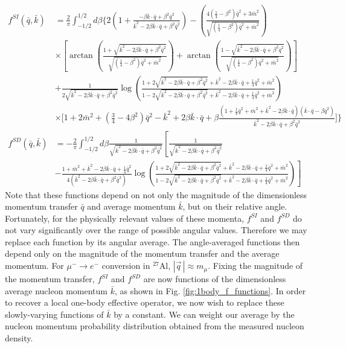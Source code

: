 \documentclass{book}[letterpaper,12pt]
\begin{document}
\begin{equation}
\begin{split}
f^{SI}(\bar{q},\bar{k})&=\frac{2}{\pi}\int_{-1/2}^{1/2}d\beta\Bigg\{2\left(1+\frac{-\beta\bar{k}\cdot\bar{q}+\beta^2\bar{q}^2}{\bar{k}^2-2\beta\bar{k}\cdot\bar{q}+\beta^2\bar{q}^2}\right)-\left(\frac{4(\frac{1}{4}-\beta^2)\bar{q}^2+3\bar{m}^2}{\sqrt{(\frac{1}{4}-\beta^2)\bar{q}^2+\bar{m}^2}}\right)\\
&\times\left[\arctan\left(\frac{1+\sqrt{\bar{k}^2-2\beta\bar{k}\cdot\bar{q}+\beta^2\bar{q}^2}}{\sqrt{(\frac{1}{4}-\beta^2)\bar{q}^2+\bar{m}^2}}\right)+\arctan\left(\frac{1-\sqrt{\bar{k}^2-2\beta\bar{k}\cdot\bar{q}+\beta^2\bar{q}^2}}{\sqrt{(\frac{1}{4}-\beta^2)\bar{q}^2+\bar{m}^2}}\right)\right]\\
&+\frac{1}{2\sqrt{\bar{k}^2-2\beta\bar{k}\cdot\bar{q}+\beta^2\bar{q}^2}}\log\left(\frac{1+2\sqrt{\bar{k}^2-2\beta\bar{k}\cdot\bar{q}+\beta^2\bar{q}^2}+\bar{k}^2-2\beta\bar{k}\cdot\bar{q}+\frac{1}{4}\bar{q}^2+\bar{m}^2}{1-2\sqrt{\bar{k}^2-2\beta\bar{k}\cdot\bar{q}+\beta^2\bar{q}^2}+\bar{k}^2-2\beta\bar{k}\cdot\bar{q}+\frac{1}{4}\bar{q}^2+\bar{m}^2}\right)\\
&\times\Bigg[1+2\bar{m}^2+\left(\frac{3}{4}-4\beta^2\right)\bar{q}^2-\bar{k}^2+2\beta\bar{k}\cdot\bar{q}+\beta\frac{\left(1+\frac{1}{4}\bar{q}^2+\bar{m}^2+\bar{k}^2-2\beta\bar{k}\cdot\bar{q}\right)\left(\bar{k}\cdot\bar{q}-\beta\bar{q}^2\right)}{\bar{k}^2-2\beta\bar{k}\cdot\bar{q}+\beta^2\bar{q}^2}\Bigg]\Bigg\}\\
f^{SD}(\bar{q},\bar{k})&=-\frac{2}{\pi}\int_{-1/2}^{1/2}d\beta\frac{1}{\sqrt{\bar{k}^2-2\beta\bar{k}\cdot\bar{q}+\beta^2\bar{q}^2}}\left[\frac{1}{\sqrt{\bar{k}^2-2\beta\bar{k}\cdot\bar{q}+\beta^2\bar{q}^2}}\right.\\
&\left.-\frac{1+\bar{m}^2+\bar{k}^2-2\beta\bar{k}\cdot\bar{q}+\frac{1}{4}\bar{q}^2}{4\left(\bar{k}^2-2\beta\bar{k}\cdot\bar{q}+\beta^2\bar{q}^2\right)}\log\left(\frac{1+2\sqrt{\bar{k}^2-2\beta\bar{k}\cdot\bar{q}+\beta^2\bar{q}^2}+\bar{k}^2-2\beta\bar{k}\cdot\bar{q}+\frac{1}{4}\bar{q}^2+\bar{m}^2}{1-2\sqrt{\bar{k}^2-2\beta\bar{k}\cdot\bar{q}+\beta^2\bar{q}^2}+\bar{k}^2-2\beta\bar{k}\cdot\bar{q}+\frac{1}{4}\bar{q}^2+\bar{m}^2}\right)\right]
\end{split}
\end{equation}
Note that these functions depend on not only the magnitude of the dimensionless momentum transfer $\bar{q}$ and average momentum $\bar{k}$, but on their relative angle. Fortunately, for the physically relevant values of these momenta, $f^{SI}$ and $f^{SD}$ do not vary significantly over the range of possible angular values. Therefore we may replace each function by its angular average. The angle-averaged functions then depend only on the magnitude of the momentum transfer and the average momentum. For $\mu^-\rightarrow e^-$ conversion in $^{27}$Al, $|\vec{q}\,|\approx m_{\mu}$. Fixing the magnitude of the momentum transfer, $f^{SI}$ and $f^{SD}$ are now functions of the dimensionless average nucleon momentum $\bar{k}$, as shown in Fig. \ref{fig:1body_f_functions}. In order to recover a local one-body effective operator, we now wish to replace these slowly-varying functions of $\bar{k}$ by a constant. We can weight our average by the nucleon momentum probability distribution obtained from the measured nucleon density.
\end{document}
